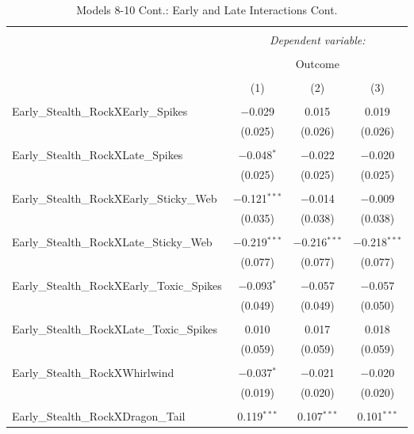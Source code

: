 \documentclass[12pt,twoside]{reedthesis}
\begin{document}
  \begin{table}[!htbp] \centering 
    \caption{Models 8-10 Cont.: Early and Late Interactions Cont.} 
    \label{} 
  \small 
  \begin{tabular}{@{\extracolsep{5pt}}lccc} 
  \\[-1.8ex]\hline 
  \hline \\[-1.8ex] 
   & \multicolumn{3}{c}{\textit{Dependent variable:}} \\ 
  \cline{2-4} 
  \\[-1.8ex] & \multicolumn{3}{c}{Outcome} \\ 
  \\[-1.8ex] & (1) & (2) & (3)\\ 
  \hline \\[-1.8ex] 
   Early\_Stealth\_RockXEarly\_Spikes & $-$0.029 & 0.015 & 0.019 \\ 
    & (0.025) & (0.026) & (0.026) \\ 
    & & & \\ 
   Early\_Stealth\_RockXLate\_Spikes & $-$0.048$^{*}$ & $-$0.022 & $-$0.020 \\ 
    & (0.025) & (0.025) & (0.025) \\ 
    & & & \\ 
   Early\_Stealth\_RockXEarly\_Sticky\_Web & $-$0.121$^{***}$ & $-$0.014 & $-$0.009 \\ 
    & (0.035) & (0.038) & (0.038) \\ 
    & & & \\ 
   Early\_Stealth\_RockXLate\_Sticky\_Web & $-$0.219$^{***}$ & $-$0.216$^{***}$ & $-$0.218$^{***}$ \\ 
    & (0.077) & (0.077) & (0.077) \\ 
    & & & \\ 
   Early\_Stealth\_RockXEarly\_Toxic\_Spikes & $-$0.093$^{*}$ & $-$0.057 & $-$0.057 \\ 
    & (0.049) & (0.049) & (0.050) \\ 
    & & & \\ 
   Early\_Stealth\_RockXLate\_Toxic\_Spikes & 0.010 & 0.017 & 0.018 \\ 
    & (0.059) & (0.059) & (0.059) \\ 
    & & & \\ 
   Early\_Stealth\_RockXWhirlwind & $-$0.037$^{*}$ & $-$0.021 & $-$0.020 \\ 
    & (0.019) & (0.020) & (0.020) \\ 
    & & & \\ 
   Early\_Stealth\_RockXDragon\_Tail & 0.119$^{***}$ & 0.107$^{***}$ & 0.101$^{***}$ \\ 

\end{tabular}
\end{table}
\end{document}
